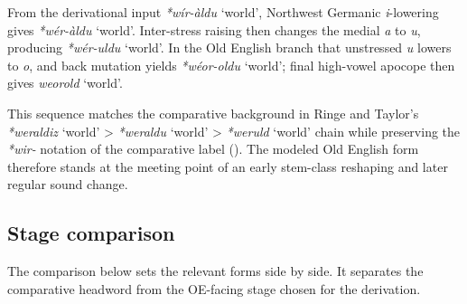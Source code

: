 \documentclass[
  british,
  a4paper,
  openany]{book}
\providecommand{\Recon}[1]{\emph{*#1}}
{\catcode`→=\active \global\def→{\ensuremath{\rightarrow}}}
\providecommand{\Recon}[1]{\emph{*#1}}
{\catcode`→=\active \global\def→{\ensuremath{\rightarrow}}}
\begin{document}
From the derivational input \Recon{wír-àldu} `world', Northwest Germanic
\emph{i}-lowering gives \Recon{wér-àldu} `world'. Inter-stress raising
then changes the medial \emph{a} to \emph{u}, producing \Recon{wér-uldu}
`world'. In the Old English branch that unstressed \emph{u} lowers to
\emph{o}, and back mutation yields \Recon{wéor-oldu} `world'; final
high-vowel apocope then gives \emph{weorold} `world'.

This sequence matches the comparative background in Ringe and Taylor's
\Recon{weraldiz} `world' \textgreater{} \Recon{weraldu} `world'
\textgreater{} \Recon{weruld} `world' chain while preserving the
\emph{*wir-} notation of the comparative label
(). The
modeled Old English form therefore stands at the meeting point of an
early stem-class reshaping and later regular sound change.

\subsection{Stage comparison}\label{stage-comparison-3}

The comparison below sets the relevant forms side by side. It separates
the comparative headword from the OE-facing stage chosen for the
derivation.
\end{document}
